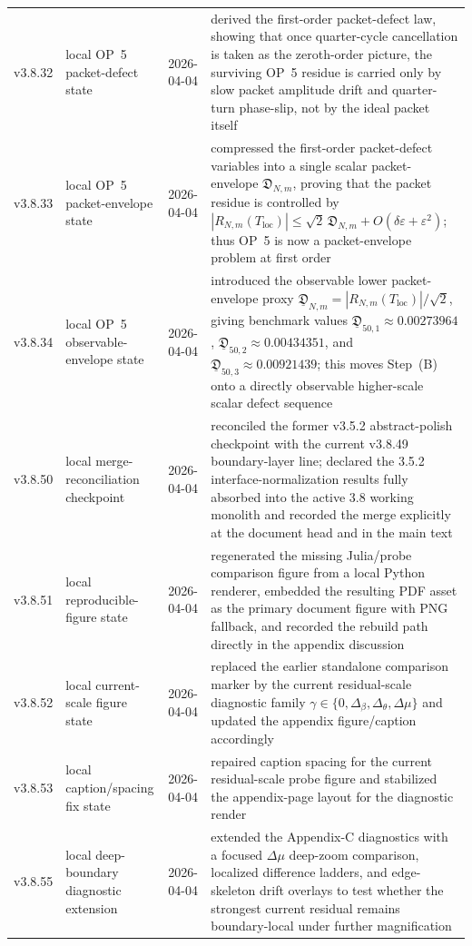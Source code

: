 {\begin{longtable}{|p{}|p{}|p{}|p{}|}
v3.8.32 & local OP~5 packet-defect state & 2026-04-04 & derived the first-order packet-defect law, showing that once quarter-cycle cancellation is taken as the zeroth-order picture, the surviving OP~5 residue is carried only by slow packet amplitude drift and quarter-turn phase-slip, not by the ideal packet itself \\
v3.8.33 & local OP~5 packet-envelope state & 2026-04-04 & compressed the first-order packet-defect variables into a single scalar packet-envelope \(\mathfrak D_{N,m}\), proving that the packet residue is controlled by \(|R_{N,m}(T_{\mathrm{loc}})|\le \sqrt2\,\mathfrak D_{N,m}+O(\delta\varepsilon+\varepsilon^2)\); thus OP~5 is now a packet-envelope problem at first order \\
v3.8.34 & local OP~5 observable-envelope state & 2026-04-04 & introduced the observable lower packet-envelope proxy \(\underline{\mathfrak D}_{N,m}=|R_{N,m}(T_{\mathrm{loc}})|/\sqrt2\), giving benchmark values \(\underline{\mathfrak D}_{50,1}\approx 0.00273964\), \(\underline{\mathfrak D}_{50,2}\approx 0.00434351\), and \(\underline{\mathfrak D}_{50,3}\approx 0.00921439\); this moves Step~(B) onto a directly observable higher-scale scalar defect sequence \\
\hline
v3.8.50 & local merge-reconciliation checkpoint & 2026-04-04 & reconciled the former v3.5.2 abstract-polish checkpoint with the current v3.8.49 boundary-layer line; declared the 3.5.2 interface-normalization results fully absorbed into the active 3.8 working monolith and recorded the merge explicitly at the document head and in the main text \\
\hline
v3.8.51 & local reproducible-figure state & 2026-04-04 & regenerated the missing Julia/probe comparison figure from a local Python renderer, embedded the resulting PDF asset as the primary document figure with PNG fallback, and recorded the rebuild path directly in the appendix discussion \\
\hline
v3.8.52 & local current-scale figure state & 2026-04-04 & replaced the earlier standalone comparison marker by the current residual-scale diagnostic family $\gamma\in\{0,\Delta_\beta,\Delta_\theta,\Delta\mu\}$ and updated the appendix figure/caption accordingly \\
\hline
v3.8.53 & local caption/spacing fix state & 2026-04-04 & repaired caption spacing for the current residual-scale probe figure and stabilized the appendix-page layout for the diagnostic render \\
\hline
v3.8.55 & local deep-boundary diagnostic extension & 2026-04-04 & extended the Appendix-C diagnostics with a focused $\Delta\mu$ deep-zoom comparison, localized difference ladders, and edge-skeleton drift overlays to test whether the strongest current residual remains boundary-local under further magnification \\

\end{longtable}}
